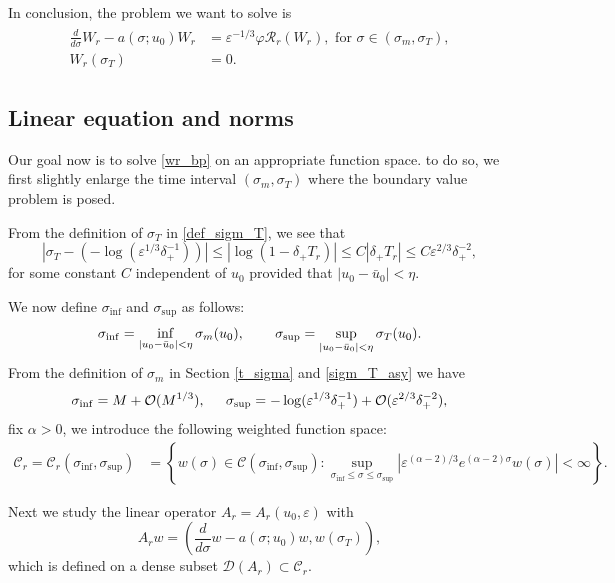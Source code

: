 \documentclass[letterpaper,11pt]{article}
\newcommand{\rmO}{\mathcal{O}}
\newcommand{\eps}{\varepsilon}
\newcommand{\Ral}{\mathcal{R}}
\numberwithin{equation}{section}
\theoremstyle{plain}
\begin{document}
In conclusion, the problem we want to solve is
\begin{align}\label{wr_bp}
\begin{split}
\frac{d}{d\sigma} W_r - a(\sigma;u_0)W_r &= \eps^{-1/3}\varphi \Ral_r(W_r), \text{ for } \sigma \in (\sigma_m, \sigma_T),\\
W_r(\sigma_T) &= 0.
\end{split}
\end{align}


\subsection{Linear equation and norms}


Our goal now is to solve \eqref{wr_bp} on an appropriate function space. to do so, we first slightly enlarge the time interval $(\sigma_m, \sigma_T)$ where the boundary value problem is posed.

From the definition of $\sigma_T$ in \eqref{def_sigm_T}, we see that
\begin{equation}\label{sigm_T_asy}
|\sigma_T -(-\log(\eps^{1/3}\delta_+^{-1}))| \le |\log(1-\delta_+ T_r)| \le  C|\delta_+ T_r|\le C\eps^{2/3}\delta_+^{-2},
\end{equation} 
for some constant $C$ independent of $u_0$ provided that $|u_0-\bar{u}_0|<\eta$.

We now define $\sigma_{\inf}$ and $\sigma_{\sup}$ as follows:
\[
\sigma_{\inf} = \inf_{|u_0-\bar{u}_0|<\eta}\sigma_m(u_0), \hspace{0.3in} \sigma_{\sup} = \sup_{|u_0-\bar{u}_0|<\eta}\sigma_T(u_0).
\]
From the definition of $\sigma_m$ in Section \ref{t_sigma} and \eqref{sigm_T_asy} we have
\[
\sigma_{\inf} = M + \rmO(M^{1/3}), \hspace{0.2in} \sigma_{\sup} = -\log(\eps^{1/3}\delta_+^{-1}) + \rmO(\eps^{2/3}\delta_+^{-2}),
\]
fix $\alpha>0$, we introduce the following weighted function space:
\begin{align*}
\mathcal{C}_r=\mathcal{C}_r(\sigma_{\inf}, \sigma_{\sup}) &= \left\{ w(\sigma) \in \mathcal{C}(\sigma_{\inf}, \sigma_{\sup}) : \sup_{\sigma_{\inf} \le \sigma \le \sigma_{\sup} } \left|\eps^{(\alpha-2)/3} e^{(\alpha-2)\sigma}w(\sigma)\right| < \infty \right\}. 
\end{align*}

Next we study the linear operator $A_r=A_r(u_0,\eps)$ with
\[
A_r w = \left( \frac{d}{d\sigma}w-a(\sigma; u_0) w,  w(\sigma_T)\right),
\]
which is defined on a dense subset $\mathcal{D}(A_r) \subset \mathcal{C}_r$.
\end{document}
